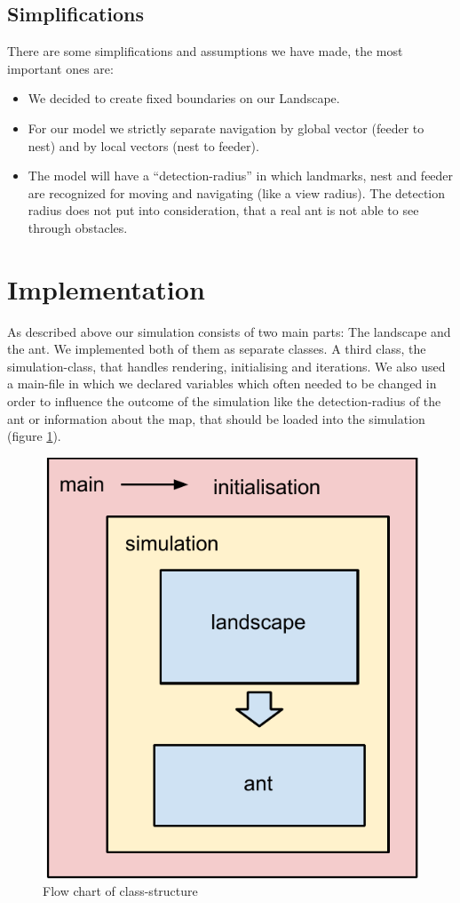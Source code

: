 \documentclass[11pt]{article}
\begin{document}
\subsection{Simplifications}
There are some simplifications and assumptions we have made, the most important ones are:
\begin{itemize}
\item We decided to create fixed boundaries on our Landscape.
\item For our model we strictly separate navigation by global vector (feeder to nest) and by local vectors (nest to feeder).
\item The model will have a “detection-radius” in which landmarks, nest and feeder are recognized for moving and navigating (like a view radius). The detection radius does not put into consideration, that a real ant is not able to see through obstacles.
\end{itemize}
\newpage

\section{Implementation}
As described above our simulation consists of two main parts: The landscape and the ant. We implemented both of them as separate classes. A third class, the simulation-class, that handles rendering, initialising and iterations. We also used a main-file in which we declared variables which often needed to be changed in order to influence the outcome of the simulation like the detection-radius of the ant or information about the map, that should be loaded into the simulation (figure \ref{fig2}).

\begin{figure}[h!]
   \centering
   \includegraphics[scale=0.7]{images/Klassenhierarchie.pdf}
   \caption[Flow chart of class-structure]{Flow chart of class-structure}
\label{fig2}
\end{figure}
\end{document}
